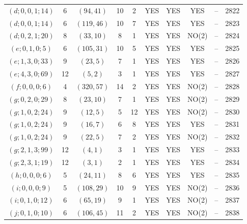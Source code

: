 \begin{longtable}{|c|c|c|c|c|c|c|c|c|c|}
$(d; 0, 0, 1; 14)$ & 6 & $(94, 41)$ & 10 & 2 & YES & YES & YES & -- & 2822\\
$(d; 0, 0, 1; 14)$ & 6 & $(119, 46)$ & 10 & 7 & YES & YES & YES & -- & 2823\\
$(d; 0, 2, 1; 20)$ & 8 & $(33, 10)$ & 8 & 1 & YES & YES & NO(2) & -- & 2824\\
$(e; 0, 1, 0; 5)$ & 6 & $(105, 31)$ & 10 & 5 & YES & YES & YES & -- & 2825\\
$(e; 1, 3, 0; 33)$ & 9 & $(23, 5)$ & 7 & 1 & YES & YES & YES & -- & 2826\\
$(e; 4, 3, 0; 69)$ & 12 & $(5, 2)$ & 3 & 1 & YES & YES & YES & -- & 2827\\
$(f; 0, 0, 0; 6)$ & 4 & $(320, 57)$ & 14 & 2 & YES & YES & NO(2) & -- & 2828\\
$(g; 0, 2, 0; 29)$ & 8 & $(23, 10)$ & 7 & 1 & YES & YES & NO(2) & -- & 2829\\
$(g; 1, 0, 2; 24)$ & 9 & $(12, 5)$ & 5 & 12 & YES & YES & NO(2) & -- & 2830\\
$(g; 1, 0, 2; 24)$ & 9 & $(16, 7)$ & 6 & 8 & YES & YES & YES & -- & 2831\\
$(g; 1, 0, 2; 24)$ & 9 & $(22, 5)$ & 7 & 2 & YES & YES & NO(2) & -- & 2832\\
$(g; 2, 1, 3; 99)$ & 12 & $(4, 1)$ & 3 & 1 & YES & YES & YES & -- & 2833\\
$(g; 2, 3, 1; 19)$ & 12 & $(3, 1)$ & 2 & 1 & YES & YES & YES & -- & 2834\\
$(h; 0, 0, 0; 6)$ & 5 & $(24, 11)$ & 8 & 6 & YES & YES & YES & -- & 2835\\
$(i; 0, 0, 0; 9)$ & 5 & $(108, 29)$ & 10 & 9 & YES & YES & NO(2) & -- & 2836\\
$(i; 0, 1, 0; 12)$ & 6 & $(65, 19)$ & 9 & 1 & YES & YES & NO(2) & -- & 2837\\
$(j; 0, 1, 0; 10)$ & 6 & $(106, 45)$ & 11 & 2 & YES & YES & NO(2) & -- & 2838
\end{longtable}
